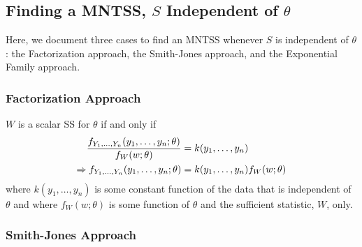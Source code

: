 \documentclass[a4paper,12pt]{scrartcl}
\begin{document}
\newpage
\subsection{Finding a MNTSS, $S$ Independent of $\theta$}

Here, we document three cases to find an MNTSS whenever $S$ is
independent of $\theta$: the Factorization
approach, the Smith-Jones approach, and the Exponential Family
approach.

\subsubsection{Factorization Approach}

$W$ is a scalar SS for $\theta$ if and only if
\begin{align}
   \label{factor}
   \frac{f_{Y_1,\dots,Y_n}(y_1, \ldots, y_n; \theta)}{
      f_W(w; \theta)} &= k(y_1,\ldots,y_n)
      \notag\\
   \Rightarrow f_{Y_1,\dots,Y_n}(y_1, \ldots, y_n; \theta) &=
      k(y_1,\ldots,y_n) f_W(w; \theta)
\end{align}
where $k(y_1, \ldots, y_n)$ is some constant function of the data
that is independent of $\theta$ and where $f_W(w; \theta)$ is
some function of $\theta$ and the sufficient statistic, $W$, only.

\subsubsection{Smith-Jones Approach}
\end{document}
